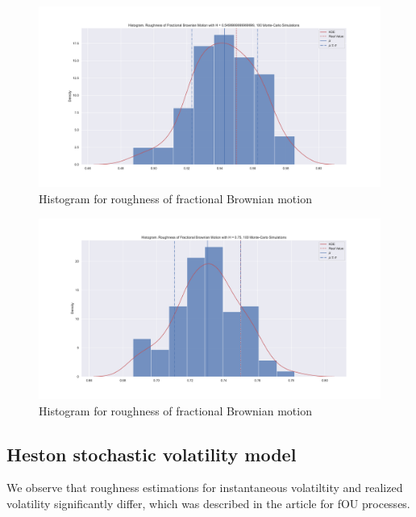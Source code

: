             \begin{figure}[htbp]
                \centering
                \includegraphics[width=\linewidth]{fig/Histogram. Roughness of Fractional Brownian Motion with H = 0.55, 100 Monte-Carlo Simulations.pdf}
                \caption{Histogram for roughness of fractional Brownian motion}
            \end{figure}
            \begin{figure}[htbp]
                \centering
                \includegraphics[width=\linewidth]{fig/Histogram. Roughness of Fractional Brownian Motion with H = 0.75, 100 Monte-Carlo Simulations.pdf}
                \caption{Histogram for roughness of fractional Brownian motion}
            \end{figure}

   \subsection{Heston stochastic volatility model}
        We observe that roughness estimations for instantaneous volatiltity and realized volatility significantly differ, which was described in the article for fOU processes.
    

